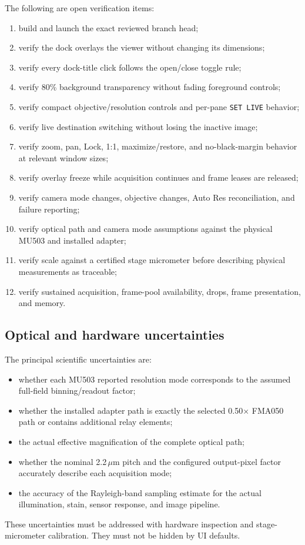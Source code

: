 \documentclass[11pt,a4paper,oneside]{article}
\begin{document}
The following are open verification items:
\begin{enumerate}
  \item build and launch the exact reviewed branch head;
  \item verify the dock overlays the viewer without changing its dimensions;
  \item verify every dock-title click follows the open/close toggle rule;
  \item verify 80\% background transparency without fading foreground controls;
  \item verify compact objective/resolution controls and per-pane \texttt{SET LIVE} behavior;
  \item verify live destination switching without losing the inactive image;
  \item verify zoom, pan, Lock, 1:1, maximize/restore, and no-black-margin behavior at relevant window sizes;
  \item verify overlay freeze while acquisition continues and frame leases are released;
  \item verify camera mode changes, objective changes, Auto Res reconciliation, and failure reporting;
  \item verify optical path and camera mode assumptions against the physical MU503 and installed adapter;
  \item verify scale against a certified stage micrometer before describing physical measurements as traceable;
  \item verify sustained acquisition, frame-pool availability, drops, frame presentation, and memory.
\end{enumerate}

\subsection{Optical and hardware uncertainties}
The principal scientific uncertainties are:
\begin{itemize}
  \item whether each MU503 reported resolution mode corresponds to the assumed full-field binning/readout factor;
  \item whether the installed adapter path is exactly the selected 0.50$\times$ FMA050 path or contains additional relay elements;
  \item the actual effective magnification of the complete optical path;
  \item whether the nominal 2.2\,$\mu$m pitch and the configured output-pixel factor accurately describe each acquisition mode;
  \item the accuracy of the Rayleigh-band sampling estimate for the actual illumination, stain, sensor response, and image pipeline.
\end{itemize}
These uncertainties must be addressed with hardware inspection and stage-micrometer calibration. They must not be hidden by UI defaults.
\end{document}
